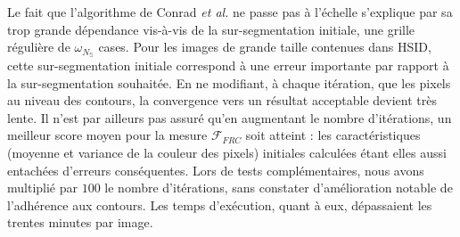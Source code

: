 Le fait que l'algorithme de Conrad \textit{et al.} ne passe pas à l'échelle s'explique par sa trop grande dépendance vis-à-vis de la sur-segmentation initiale, une grille régulière de $\omega_{N_{\mathbb{S}}}$ cases. Pour les images de grande taille contenues dans HSID,  cette sur-segmentation initiale correspond à une erreur importante par rapport à la sur-segmentation souhaitée. En ne modifiant, à chaque itération, que les pixels au niveau des contours, la convergence vers un résultat acceptable devient très lente. Il n'est par ailleurs  pas assuré qu'en augmentant le nombre d'itérations, un meilleur score moyen pour la mesure $\mathcal{F}_{FRC}$ soit atteint : les caractéristiques (moyenne et variance de la couleur des pixels) initiales calculées étant elles aussi entachées d'erreurs conséquentes. Lors de tests complémentaires, nous avons multiplié par $100$ le nombre d'itérations, sans constater d'amélioration notable de l'adhérence aux contours. Les temps d'exécution, quant à eux, dépassaient les trentes minutes par image. 


